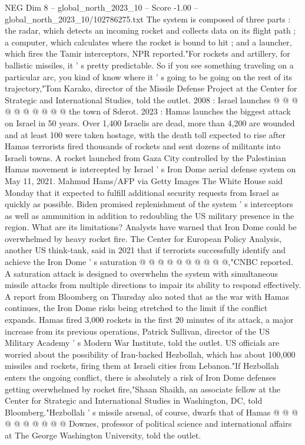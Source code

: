 \begin{textsample}{NEG Dim 8 – global\_north\_2023\_10 – Score -1.00 – global\_north\_2023\_10/102786275.txt}
The system is composed of three parts : the radar, which detects an incoming rocket and collects data on its flight path ; a computer, which calculates where the rocket is bound to hit ; and a launcher, which fires the Tamir interceptors, NPR reported."For rockets and artillery, for ballistic missiles, it ' s pretty predictable.
So if you see something traveling on a particular arc, you kind of know where it ' s going to be going on the rest of its trajectory,"Tom Karako, director of the Missile Defense Project at the Center for Strategic and International Studies, told the outlet. 2008 : Israel launches @ @ @ @ @ @ @ @ @ @ the town of Sderot. 2023 : Hamas launches the biggest attack on Israel in 50 years.
Over 1,400 Israelis are dead, more than 4,200 are wounded and at least 100 were taken hostage, with the death toll expected to rise after Hamas terrorists fired thousands of rockets and sent dozens of militants into Israeli towns.
A rocket launched from Gaza City controlled by the Palestinian Hamas movement is intercepted by Israel ' s Iron Dome aerial defense system on May 11, 2021.
Mahmud Hams/AFP via Getty Images The White House said Monday that it expected to fulfill additional security requests from Israel as quickly as possible.
Biden promised replenishment of the system ' s interceptors as well as ammunition in addition to redoubling the US military presence in the region.
What are its limitations?
Analysts have warned that Iron Dome could be overwhelmed by heavy rocket fire.
The Center for European Policy Analysis, another US think-tank, said in 2021 that if terrorists successfully identify and achieve the Iron Dome ' s saturation @ @ @ @ @ @ @ @ @ @,"CNBC reported.
A saturation attack is designed to overwhelm the system with simultaneous missile attacks from multiple directions to impair its ability to respond effectively.
A report from Bloomberg on Thursday also noted that as the war with Hamas continues, the Iron Dome risks being stretched to the limit if the conflict expands.
Hamas fired 3,000 rockets in the first 20 minutes of its attack, a major increase from its previous operations, Patrick Sullivan, director of the US Military Academy ' s Modern War Institute, told the outlet.
US officials are worried about the possibility of Iran-backed Hezbollah, which has about 100,000 missiles and rockets, firing them at Israeli cities from Lebanon."If Hezbollah enters the ongoing conflict, there is absolutely a risk of Iron Dome defenses getting overwhelmed by rocket fire,"Shaan Shaikh, an associate fellow at the Center for Strategic and International Studies in Washington, DC, told Bloomberg."Hezbollah ' s missile arsenal, of course, dwarfs that of Hamas @ @ @ @ @ @ @ @ @ @ Downes, professor of political science and international affairs at The George Washington University, told the outlet.

\end{textsample}
